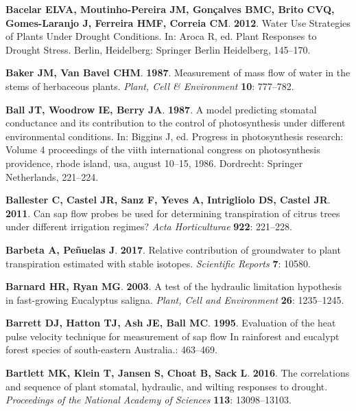 \documentclass[11pt,twoside]{reedthesis}
\begin{document}
\hypertarget{ref-Bacelar2012}{}
\textbf{\textnormal{Bacelar ELVA}, \textnormal{Moutinho-Pereira JM},
\textnormal{Gonçalves BMC}, \textnormal{Brito CVQ},
\textnormal{Gomes-Laranjo J}, \textnormal{Ferreira HMF},
\textnormal{Correia CM}}. \textbf{2012}. Water Use Strategies of Plants
Under Drought Conditions. In: Aroca R, ed. Plant Responses to Drought
Stress. Berlin, Heidelberg: Springer Berlin Heidelberg, 145--170.

\hypertarget{ref-Baker1987}{}
\textbf{\textnormal{Baker JM}, \textnormal{Van Bavel CHM}}.
\textbf{1987}. Measurement of mass flow of water in the stems of
herbaceous plants. \emph{Plant, Cell \& Environment} \textbf{10}:
777--782.

\hypertarget{ref-Ball1987}{}
\textbf{\textnormal{Ball JT}, \textnormal{Woodrow IE}, \textnormal{Berry
JA}}. \textbf{1987}. A model predicting stomatal conductance and its
contribution to the control of photosynthesis under different
environmental conditions. In: Biggins J, ed. Progress in photosynthesis
research: Volume 4 proceedings of the viith international congress on
photosynthesis providence, rhode island, usa, august 10--15, 1986.
Dordrecht: Springer Netherlands, 221--224.

\hypertarget{ref-Ballester2011}{}
\textbf{\textnormal{Ballester C}, \textnormal{Castel JR},
\textnormal{Sanz F}, \textnormal{Yeves A}, \textnormal{Intrigliolo DS},
\textnormal{Castel JR}}. \textbf{2011}. Can sap flow probes be used for
determining transpiration of citrus trees under different irrigation
regimes? \emph{Acta Horticulturae} \textbf{922}: 221--228.

\hypertarget{ref-barbeta_relative_2017}{}
\textbf{\textnormal{Barbeta A}, \textnormal{Peñuelas J}}. \textbf{2017}.
Relative contribution of groundwater to plant transpiration estimated
with stable isotopes. \emph{Scientific Reports} \textbf{7}: 10580.

\hypertarget{ref-barnard_test_2003}{}
\textbf{\textnormal{Barnard HR}, \textnormal{Ryan MG}}. \textbf{2003}. A
test of the hydraulic limitation hypothesis in fast-growing Eucalyptus
saligna. \emph{Plant, Cell and Environment} \textbf{26}: 1235--1245.

\hypertarget{ref-Barrett1995}{}
\textbf{\textnormal{Barrett DJ}, \textnormal{Hatton TJ}, \textnormal{Ash
JE}, \textnormal{Ball MC}}. \textbf{1995}. Evaluation of the heat pulse
velocity technique for measurement of sap flow In rainforest and
eucalypt forest species of south-eastern Australia.: 463--469.

\hypertarget{ref-bartlett_correlations_2016}{}
\textbf{\textnormal{Bartlett MK}, \textnormal{Klein T},
\textnormal{Jansen S}, \textnormal{Choat B}, \textnormal{Sack L}}.
\textbf{2016}. The correlations and sequence of plant stomatal,
hydraulic, and wilting responses to drought. \emph{Proceedings of the
National Academy of Sciences} \textbf{113}: 13098--13103.
\end{document}
